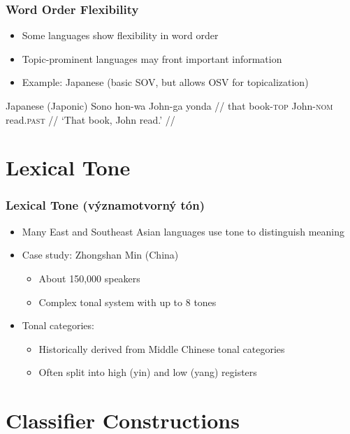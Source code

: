 \documentclass{beamer}
\begin{document}
\begin{frame}
\frametitle{Word Order Flexibility}
\begin{itemize}
\item Some languages show flexibility in word order
\item Topic-prominent languages may front important information
\item Example: Japanese (basic SOV, but allows OSV for topicalization)
\end{itemize}
\begin{exampleblock}{Japanese (Japonic)}
\begingl
\gla Sono hon-wa John-ga yonda //
\glb that book-\textsc{top} John-\textsc{nom} read.\textsc{past} //
\glft `That book, John read.' //
\endgl
\end{exampleblock}
\end{frame}




\section{Lexical Tone}

\begin{frame}
\frametitle{Lexical Tone (významotvorný tón)}
\begin{itemize}
\item Many East and Southeast Asian languages use tone to distinguish meaning
\item Case study: Zhongshan Min (China)
  \begin{itemize}
  \item About 150,000 speakers
  \item Complex tonal system with up to 8 tones
  \end{itemize}
\item Tonal categories:
  \begin{itemize}
  \item Historically derived from Middle Chinese tonal categories
  \item Often split into high (yin) and low (yang) registers
  \end{itemize}
\end{itemize}
\end{frame}

\section{Classifier Constructions}
\end{document}
